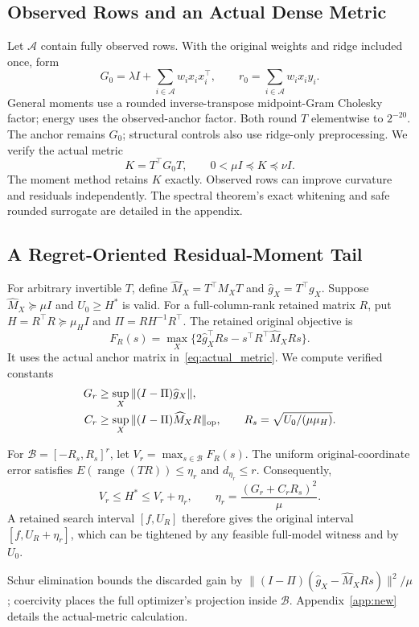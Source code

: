 \subsection{Observed Rows and an Actual Dense Metric}\label{sec:anchor}
Let $\mathcal A$ contain fully observed rows. With the original weights and ridge included once, form
\begin{equation}
 G_0=\lambda I+\sum_{i\in\mathcal A}w_ix_ix_i^\top,
 \qquad r_0=\sum_{i\in\mathcal A}w_ix_iy_i.
\end{equation}
General moments use a rounded inverse-transpose midpoint-Gram Cholesky factor; energy uses the observed-anchor factor. Both round $T$ elementwise to $2^{-20}$. The anchor remains $G_0$; structural controls also use ridge-only preprocessing. We verify the actual metric
\begin{equation}
 K=T^\top G_0T,\qquad 0<\mu I\preceq K\preceq\nu I.
 \label{eq:actual_metric}
\end{equation}
The moment method retains $K$ exactly. Observed rows can improve curvature and residuals independently. The spectral theorem's exact whitening and safe rounded surrogate are detailed in the appendix.

\subsection{A Regret-Oriented Residual-Moment Tail}\label{sec:moment}
For arbitrary invertible $T$, define $\widehat M_X=T^\top M_XT$ and $\widehat g_X=T^\top g_X$. Suppose $\widehat M_X\succeq\mu I$ and $U_0\geq H^*$ is valid. For a full-column-rank retained matrix $R$, put $H=R^\top R\succeq\mu_HI$ and $\Pi=RH^{-1}R^\top$. The retained original objective is
\begin{equation}
 F_R(s)=\max_X\{2\widehat g_X^\top Rs-s^\top R^\top\widehat M_XRs\}.
\end{equation}
It uses the actual anchor matrix in~\eqref{eq:actual_metric}. We compute verified constants
\begin{align}
 G_r&\geq\sup_X\|(I-\Pi)\widehat g_X\|,\nonumber\\
 C_r&\geq\sup_X\|(I-\Pi)\widehat M_XR\|_{\mathrm{op}},\qquad
 R_s=\sqrt{U_0/(\mu\mu_H)}.\nonumber
\end{align}
\begin{theorem}\label{thm:moment}
For $\mathcal B=[-R_s,R_s]^r$, let $V_r=\max_{s\in\mathcal B}F_R(s)$. The uniform original-coordinate error satisfies $E(\operatorname{range}(TR))\le\eta_r$ and $d_{\eta_r}\le r$. Consequently,
\begin{equation}
 V_r\leq H^*\leq V_r+\eta_r,\qquad
 \eta_r=\frac{(G_r+C_rR_s)^2}{\mu}.\label{eq:moment_tail}
\end{equation}
A retained search interval $[f,U_R]$ therefore gives the original interval $[f,U_R+\eta_r]$, which can be tightened by any feasible full-model witness and by $U_0$.
\end{theorem}
Schur elimination bounds the discarded gain by $\|(I-\Pi)(\widehat g_X-\widehat M_XRs)\|^2/\mu$; coercivity places the full optimizer's projection inside $\mathcal B$. Appendix~\ref{app:new} details the actual-metric calculation.


